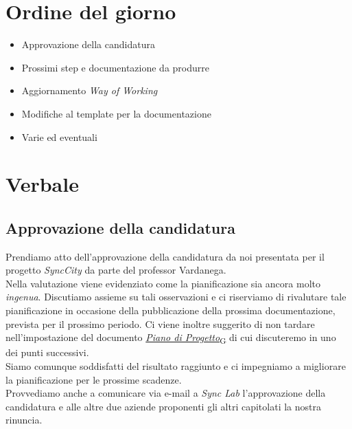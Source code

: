 \documentclass[italian,12pt]{article} %
\begin{document}
\section{Ordine del giorno}
\begin{itemize}
	\itemsep0em
	\item Approvazione della candidatura
	\item Prossimi step e documentazione da produrre
	\item Aggiornamento \textit{Way of Working}
	\item Modifiche al template per la documentazione
	\item Varie ed eventuali
\end{itemize}

\newpage

\section{Verbale}

\subsection{Approvazione della candidatura}
Prendiamo atto dell'approvazione della candidatura da noi presentata per il progetto
\textit{SyncCity} da parte del professor Vardanega. \\
Nella valutazione viene evidenziato come la pianificazione sia ancora molto \textit{ingenua}.
Discutiamo assieme su tali osservazioni e ci riserviamo di rivalutare tale
pianificazione in occasione della pubblicazione della prossima documentazione,
prevista per il prossimo periodo. Ci viene inoltre suggerito di
non tardare nell'impostazione del documento \href{https://7last.github.io/docs/rtb/documentazione-interna/glossario#piano-di-progetto}{\textit{Piano di Progetto}\textsubscript{G}} di cui
discuteremo in uno dei punti successivi. \\
Siamo comunque soddisfatti del risultato raggiunto e ci impegniamo a migliorare la
pianificazione per le prossime scadenze. \\
Provvediamo anche a comunicare via e-mail a \textit{Sync Lab} l'approvazione della
candidatura e alle altre due aziende proponenti gli altri capitolati la nostra
rinuncia.
\end{document}
